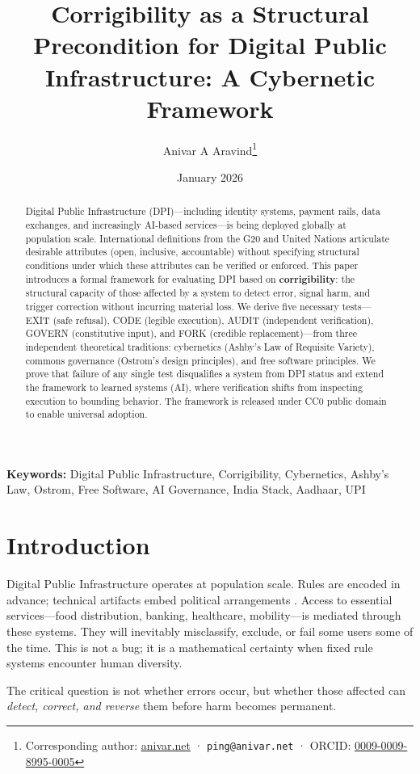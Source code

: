 \documentclass[11pt,a4paper]{article}
\title{Corrigibility as a Structural Precondition for Digital Public Infrastructure: A Cybernetic Framework}
\author[1]{Anivar A Aravind\thanks{Corresponding author: \href{https://anivar.net}{anivar.net} · \texttt{ping@anivar.net} · ORCID: \href{https://orcid.org/0009-0009-8995-0005}{0009-0009-8995-0005}}}
\affil[1]{Independent Researcher}
\date{January 2026}
\begin{document}
\maketitle

\begin{abstract}
Digital Public Infrastructure (DPI)---including identity systems, payment rails, data exchanges, and increasingly AI-based services---is being deployed globally at population scale. International definitions from the G20 and United Nations articulate desirable attributes (open, inclusive, accountable) without specifying structural conditions under which these attributes can be verified or enforced. This paper introduces a formal framework for evaluating DPI based on \textbf{corrigibility}: the structural capacity of those affected by a system to detect error, signal harm, and trigger correction without incurring material loss. We derive five necessary tests---EXIT (safe refusal), CODE (legible execution), AUDIT (independent verification), GOVERN (constitutive input), and FORK (credible replacement)---from three independent theoretical traditions: cybernetics (Ashby's Law of Requisite Variety), commons governance (Ostrom's design principles), and free software principles. We prove that failure of any single test disqualifies a system from DPI status and extend the framework to learned systems (AI), where verification shifts from inspecting execution to bounding behavior. The framework is released under CC0 public domain to enable universal adoption.
\end{abstract}

\noindent\textbf{Keywords:} Digital Public Infrastructure, Corrigibility, Cybernetics, Ashby's Law, Ostrom, Free Software, AI Governance, India Stack, Aadhaar, UPI

\section{Introduction}

Digital Public Infrastructure operates at population scale. Rules are encoded in advance; technical artifacts embed political arrangements \citep{winner1980}. Access to essential services---food distribution, banking, healthcare, mobility---is mediated through these systems. They will inevitably misclassify, exclude, or fail some users some of the time. This is not a bug; it is a mathematical certainty when fixed rule systems encounter human diversity.

The critical question is not whether errors occur, but whether those affected can \textit{detect, correct, and reverse} them before harm becomes permanent.
\end{document}
